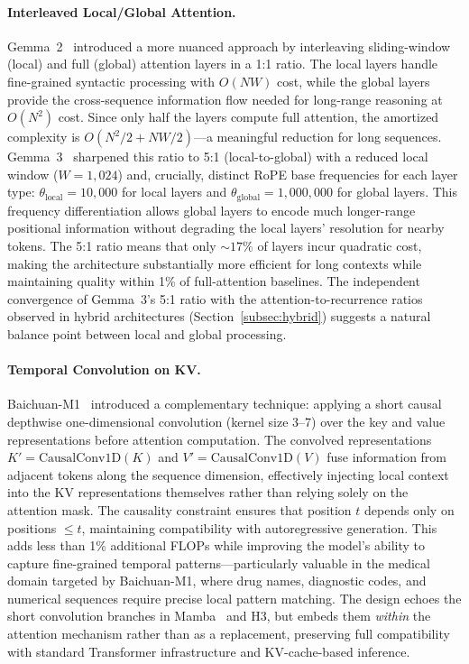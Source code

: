 \paragraph{Interleaved Local/Global Attention.}
Gemma~2~\cite{gemma2024improving} introduced a more nuanced approach by interleaving sliding-window (local) and full (global) attention layers in a 1:1 ratio. The local layers handle fine-grained syntactic processing with $O(NW)$ cost, while the global layers provide the cross-sequence information flow needed for long-range reasoning at $O(N^2)$ cost. Since only half the layers compute full attention, the amortized complexity is $O(N^2/2 + NW/2)$---a meaningful reduction for long sequences. Gemma~3~\cite{gemma2025gemma3} sharpened this ratio to 5:1 (local-to-global) with a reduced local window ($W = 1{,}024$) and, crucially, distinct RoPE base frequencies for each layer type: $\theta_{\text{local}} = 10{,}000$ for local layers and $\theta_{\text{global}} = 1{,}000{,}000$ for global layers. This frequency differentiation allows global layers to encode much longer-range positional information without degrading the local layers' resolution for nearby tokens. The 5:1 ratio means that only ${\sim}17\%$ of layers incur quadratic cost, making the architecture substantially more efficient for long contexts while maintaining quality within 1\% of full-attention baselines. The independent convergence of Gemma~3's 5:1 ratio with the attention-to-recurrence ratios observed in hybrid architectures (Section~\ref{subsec:hybrid}) suggests a natural balance point between local and global processing.

\paragraph{Temporal Convolution on KV.}
Baichuan-M1~\cite{baichuan2025m1} introduced a complementary technique: applying a short causal depthwise one-dimensional convolution (kernel size 3--7) over the key and value representations before attention computation. The convolved representations $K' = \text{CausalConv1D}(K)$ and $V' = \text{CausalConv1D}(V)$ fuse information from adjacent tokens along the sequence dimension, effectively injecting local context into the KV representations themselves rather than relying solely on the attention mask. The causality constraint ensures that position $t$ depends only on positions $\leq t$, maintaining compatibility with autoregressive generation. This adds less than 1\% additional FLOPs while improving the model's ability to capture fine-grained temporal patterns---particularly valuable in the medical domain targeted by Baichuan-M1, where drug names, diagnostic codes, and numerical sequences require precise local pattern matching. The design echoes the short convolution branches in Mamba~\cite{gu2024mamba} and H3, but embeds them \emph{within} the attention mechanism rather than as a replacement, preserving full compatibility with standard Transformer infrastructure and KV-cache-based inference.

